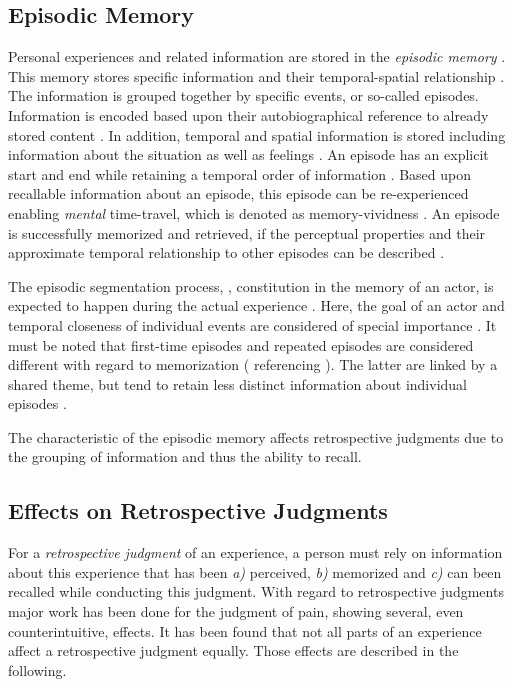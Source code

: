 \subsection{Episodic Memory}
Personal experiences and related information are stored in the \emph{episodic memory} \citep{tulving_episodic_1972}.
This memory stores specific information and their temporal-spatial relationship \citep[][p.~385]{tulving_episodic_1972}.
The information is grouped together by specific events, or so-called episodes.
Information is encoded based upon their autobiographical reference to already stored content \citep[][p.~385f.]{tulving_episodic_1972}.
In addition, temporal and spatial information is stored including information about the situation as well as feelings \citep[][p.~385f.]{tulving_episodic_1972}.
An episode has an explicit start and end while retaining a temporal order of information \citep[][p.~262]{conway_construction_2000}.
Based upon recallable information about an episode, this episode can be re-experienced enabling \emph{mental} time-travel, which is denoted as memory-vividness \citep{conway_construction_2000}.
An episode is successfully memorized and retrieved, if the perceptual properties and their approximate temporal relationship to other episodes can be described \citep{conway_construction_2000}.

The episodic segmentation process, \ie, constitution in the memory of an actor, is expected to happen during the actual experience \citep[][]{ezzyat_what_2011, kurby_segmentation_2008}.
Here, the goal of an actor and temporal closeness of individual events are considered of special importance \citep[][]{black_episodes_1979}.
It must be noted that first-time episodes and repeated episodes are considered different with regard to memorization (\citet{conway_construction_2000} referencing \citet{barsalou_content_1988}).
The latter are linked by a shared theme, but tend to retain less distinct information about individual episodes \citep{robinson_first_1992}.

The characteristic of the episodic memory affects retrospective judgments due to the grouping of information and thus the ability to recall.

\subsection{Effects on Retrospective Judgments}\label{chap03:effects}
For a \emph{retrospective judgment} of an experience, a person must rely on information about this experience that has been \emph{a)} perceived, \emph{b)} memorized and \emph{c)} can been recalled while conducting this judgment.
With regard to retrospective judgments major work has been done for the judgment of pain, showing several, even counterintuitive, effects.
It has been found that not all parts of an experience affect a retrospective judgment equally.
Those effects are described in the following.

